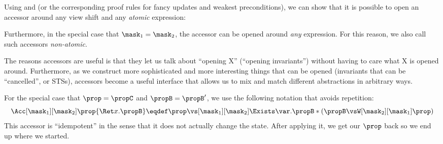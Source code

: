 Using  and  (or the corresponding proof rules for fancy updates and weakest preconditions), we can show that it is possible to open an accessor around any view shift and any \emph{atomic} expression:

Furthermore, in the special case that $\mask_1 = \mask_2$, the accessor can be opened around \emph{any} expression.
For this reason, we also call such accessors \emph{non-atomic}.

The reasons accessors are useful is that they let us talk about ``opening X'' (\eg ``opening invariants'') without having to care what X is opened around.
Furthermore, as we construct more sophisticated and more interesting things that can be opened (\eg invariants that can be ``cancelled'', or STSs), accessors become a useful interface that allows us to mix and match different abstractions in arbitrary ways.

For the special case that $\prop = \propC$ and $\propB = \propB'$, we use the following notation that avoids repetition:
\[ \Acc[\mask_1][\mask_2]\prop{\Ret x. \propB} \eqdef \prop \vs[\mask_1][\mask_2] \Exists\var. \propB * (\propB \vsW[\mask_2][\mask_1] \prop)  \]
This accessor is ``idempotent'' in the sense that it does not actually change the state.  After applying it, we get our $\prop$ back so we end up where we started.

